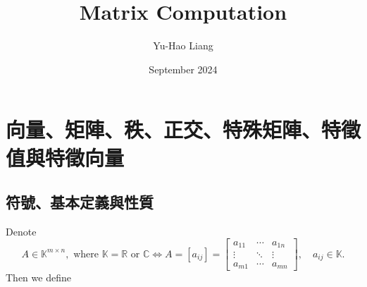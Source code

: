 \documentclass{article}
\title{Matrix Computation}
\author{Yu-Hao Liang}
\date{September 2024}
\theoremstyle{definition}
\numberwithin{theorem}{section}
\numberwithin{equation}{section}
\begin{document}
\maketitle
\section{向量、矩陣、秩、正交、特殊矩陣、特徵值與特徵向量}

\subsection{符號、基本定義與性質}

Denote
\[
    A \in \mathbb{K}^{m \times n}, \text{ where } \mathbb{K} = \mathbb{R} \text{ or } \mathbb{C}
    \Leftrightarrow
    A = [a_{ij}] = \begin{bmatrix}
    a_{11} & \cdots & a_{1n} \\
    \vdots & \ddots & \vdots \\
    a_{m1} & \cdots & a_{mn}
    \end{bmatrix},
    \quad a_{ij} \in \mathbb{K}.
\]
Then we define
\end{document}
